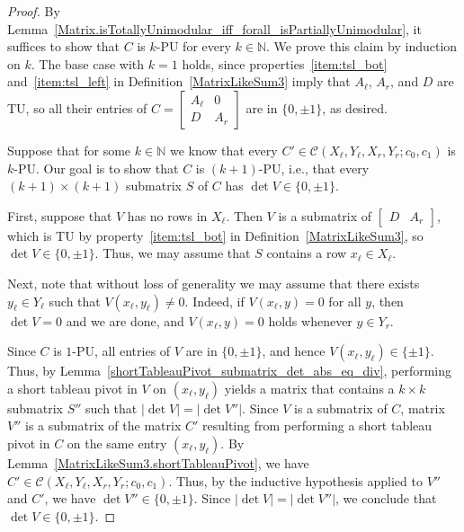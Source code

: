 \begin{proof}
    \leanok
    By Lemma~\ref{Matrix.isTotallyUnimodular_iff_forall_isPartiallyUnimodular}, it suffices to show that $C$ is $k$-PU for every $k \in \mathbb{N}$. We prove this claim by induction on $k$. The base case with $k = 1$ holds, since properties~\ref{item:tsl_bot} and~\ref{item:tsl_left} in Definition~\ref{MatrixLikeSum3} imply that $A_{\ell}$, $A_{r}$, and $D$ are TU, so all their entries of $C = \begin{bmatrix} A_{\ell} & 0 \\ D & A_{r} \end{bmatrix}$ are in $\{0, \pm 1\}$, as desired.

    Suppose that for some $k \in \mathbb{N}$ we know that every $C' \in \mathcal{C} (X_{\ell}, Y_{\ell}, X_{r}, Y_{r}; c_{0}, c_{1})$ is $k$-PU. Our goal is to show that $C$ is $(k + 1)$-PU, i.e., that every $(k + 1) \times (k + 1)$ submatrix $S$ of $C$ has $\det V \in \{0, \pm 1\}$.

    First, suppose that $V$ has no rows in $X_{\ell}$. Then $V$ is a submatrix of $\begin{bmatrix} D & A_{r} \end{bmatrix}$, which is TU by property~\ref{item:tsl_bot} in Definition~\ref{MatrixLikeSum3}, so $\det V \in \{0, \pm 1\}$. Thus, we may assume that $S$ contains a row $x_{\ell} \in X_{\ell}$.

    Next, note that without loss of generality we may assume that there exists $y_{\ell} \in Y_{\ell}$ such that $V (x_{\ell}, y_{\ell}) \neq 0$. Indeed, if $V (x_{\ell}, y) = 0$ for all $y$, then $\det V = 0$ and we are done, and $V (x_{\ell}, y) = 0$ holds whenever $y \in Y_{r}$.

    Since $C$ is $1$-PU, all entries of $V$ are in $\{0, \pm 1\}$, and hence $V (x_{\ell}, y_{\ell}) \in \{\pm 1\}$. Thus, by Lemma~\ref{shortTableauPivot_submatrix_det_abs_eq_div}, performing a short tableau pivot in $V$ on $(x_{\ell}, y_{\ell})$ yields a matrix that contains a $k \times k$ submatrix $S''$ such that $|\det V| = |\det V''|$. Since $V$ is a submatrix of $C$, matrix $V''$ is a submatrix of the matrix $C'$ resulting from performing a short tableau pivot in $C$ on the same entry $(x_{\ell}, y_{\ell})$. By Lemma~\ref{MatrixLikeSum3.shortTableauPivot}, we have $C' \in \mathcal{C} (X_{\ell}, Y_{\ell}, X_{r}, Y_{r}; c_{0}, c_{1})$. Thus, by the inductive hypothesis applied to $V''$ and $C'$, we have $\det V'' \in \{0, \pm 1\}$. Since $|\det V| = |\det V''|$, we conclude that $\det V \in \{0, \pm 1\}$.
\end{proof}

